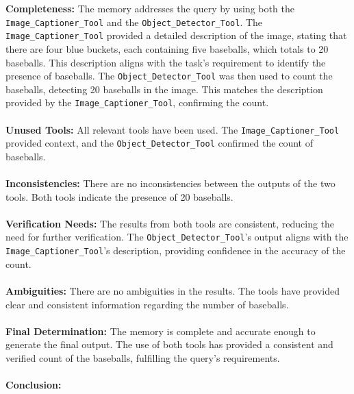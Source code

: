     
    \begin{plannerbox}
    
    \textbf{Completeness:}
    The memory addresses the query by using both the \texttt{Image\_Captioner\_Tool} and the \texttt{Object\_Detector\_Tool}. The \texttt{Image\_Captioner\_Tool} provided a detailed description of the image, stating that there are four blue buckets, each containing five baseballs, which totals to 20 baseballs. This description aligns with the task's requirement to identify the presence of baseballs.
    The \texttt{Object\_Detector\_Tool} was then used to count the baseballs, detecting 20 baseballs in the image. This matches the description provided by the \texttt{Image\_Captioner\_Tool}, confirming the count.
    \\\\
    \textbf{Unused Tools:}
    All relevant tools have been used. The \texttt{Image\_Captioner\_Tool} provided context, and the \texttt{Object\_Detector\_Tool} confirmed the count of baseballs.
    \\\\
    \textbf{Inconsistencies:}
    There are no inconsistencies between the outputs of the two tools. Both tools indicate the presence of 20 baseballs.
    \\\\
    \textbf{Verification Needs:}
    The results from both tools are consistent, reducing the need for further verification. The \texttt{Object\_Detector\_Tool}'s output aligns with the \texttt{Image\_Captioner\_Tool}'s description, providing confidence in the accuracy of the count.
    \\\\
    \textbf{Ambiguities:}
    There are no ambiguities in the results. The tools have provided clear and consistent information regarding the number of baseballs.
    \\\\
    \textbf{Final Determination:}
    The memory is complete and accurate enough to generate the final output. The use of both tools has provided a consistent and verified count of the baseballs, fulfilling the query's requirements.
    \\\\
    \textbf{Conclusion:} 
    \end{plannerbox}
    
